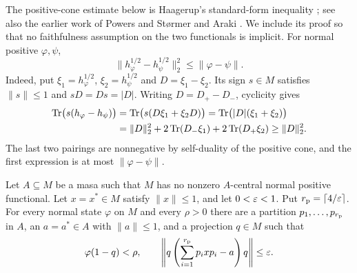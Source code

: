 The positive-cone estimate below is Haagerup's standard-form inequality
\cite[Lemma~2.10]{Haa75}; see also the earlier work of Powers and
St{\o}rmer \cite[Lemma~4.1]{PS70} and Araki
\cite[Theorem~4(8), equation~(5.10), and Section~8, Remark~2]{Ara74}. We include its proof
so that no faithfulness assumption on the two functionals is implicit.
For normal positive $\varphi,\psi$,
\begin{equation}\label{eq:positive-cone-estimate}
 \|h_\varphi^{1/2}-h_\psi^{1/2}\|_2^2
 \leq \|\varphi-\psi\|.
\end{equation}
Indeed, put $\xi_1=h_\varphi^{1/2}$, $\xi_2=h_\psi^{1/2}$ and
$D=\xi_1-\xi_2$.  Its sign $s\in M$ satisfies
$\|s\|\leq1$ and $sD=Ds=|D|$.  Writing $D=D_+-D_-$, cyclicity gives
\begin{align*}
 \operatorname{Tr}\bigl(s(h_\varphi-h_\psi)\bigr)
 &=\operatorname{Tr}\bigl(s(D\xi_1+\xi_2D)\bigr)
   =\operatorname{Tr}\bigl(|D|(\xi_1+\xi_2)\bigr)\\
 &=\|D\|_2^2+2\operatorname{Tr}(D_-\xi_1)+2\operatorname{Tr}(D_+\xi_2)
 \geq\|D\|_2^2.
\end{align*}
The last two pairings are nonnegative by self-duality of the positive
cone, and the first expression is at most $\|\varphi-\psi\|$.

\begin{lemma}\label{lem:no-central}
Let $A\subseteq M$ be a masa such that $M$ has no nonzero $A$-central
normal positive functional.  Let $x=x^*\in M$ satisfy $\|x\|\leq1$,
and let $0<\varepsilon<1$.  Put $r_{\rm p}=\lceil4/\varepsilon\rceil$.
For every normal state $\varphi$ on $M$ and every $\rho>0$ there are a
partition $p_1,\ldots,p_{r_{\rm p}}$ in $A$, an $a=a^*\in A$ with
$\|a\|\leq1$, and a projection $q\in M$ such that
\[
 \varphi(1-q)<\rho,
 \qquad
 \left\|q\left(\sum_{i=1}^{r_{\rm p}}p_i x p_i-a\right)q\right\|
 \leq\varepsilon.
\]
\end{lemma}

